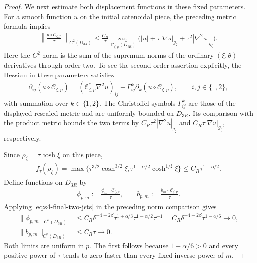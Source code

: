 \documentclass[a4paper,11pt,oneside,reqno]{amsart}
\numberwithin{equation}{section}
\theoremstyle{definition}
\begin{document}
\begin{proof}
    We next estimate both displacement functions in these
    fixed parameters. For a smooth function $u$ on the
    initial catenoidal piece, the preceding metric formula
    implies
    \begin{align*}
        \left\|\frac{u\circ\mathcal C_{\zeta,p}}{\tau}
                \right\|_{C^2(D_{3R})}
        \leq \frac{C_R}{\tau}
        \sup_{\mathcal C_{\zeta,p}(D_{3R})}
        \bigl(|u|+\tau|\nabla u|_{g_\zeta}
                    +\tau^2|\nabla^2u|_{g_\zeta}\bigr).
    \end{align*}
    Here the $C^2$ norm is the sum of the supremum norms of
    the ordinary $(\xi,\theta)$ derivatives through order two.
    To see the second-order assertion explicitly, the Hessian
    in these parameters satisfies
    \begin{align*}
        \partial_{ij}(u\circ\mathcal C_{\zeta,p})
        = (\mathcal C_{\zeta,p}^*\nabla^2u)_{ij}
          +\Gamma^k_{ij}
             \partial_k(u\circ\mathcal C_{\zeta,p}),
        \qquad i,j\in\{1,2\},
    \end{align*}
    with summation over $k\in\{1,2\}$. The Christoffel
    symbols $\Gamma^k_{ij}$ are those of the displayed
    rescaled metric and are uniformly bounded on $D_{3R}$.
    Its comparison with the product metric bounds the two
    terms by $C_R\tau^2|\nabla^2u|_{g_\zeta}$ and
    $C_R\tau|\nabla u|_{g_\zeta}$, respectively.

    Since $\rho_\zeta=\tau\cosh\xi$ on this piece,
    \begin{align*}
        f_\tau(\rho_\zeta)
        =\max\{\tau^{3/2}\cosh^{3/2}\xi,
                 \tau^{1-\alpha/2}\cosh^{1/2}\xi\}
        \leq C_R\tau^{1-\alpha/2}.
    \end{align*}
    Define functions on $D_{3R}$ by
    \begin{align*}
        \overline\phi_{p,m}
        :=\frac{\phi_m\circ\mathcal C_{\zeta,p}}\tau,
        \qquad
        \overline b_{p,m}
        :=\frac{b_m\circ\mathcal C_{\zeta,p}}\tau.
    \end{align*}
    Applying \eqref{eq:s4-final-two-jets} in the preceding
    norm comparison gives
    \begin{align*}
        \|\overline\phi_{p,m}\|_{C^2(D_{3R})}
        &\leq C_R\delta^{-4-2\beta}
            \tau^{1+\alpha/3}\tau^{1-\alpha/2}\tau^{-1}
          =C_R\delta^{-4-2\beta}\tau^{1-\alpha/6}
          \rightarrow0,\\
        \|\overline b_{p,m}\|_{C^2(D_{3R})}
        &\leq C_R\tau\rightarrow0.
    \end{align*}
    Both limits are uniform in $p$. The first follows because
    $1-\alpha/6>0$ and every positive power of $\tau$ tends
    to zero faster than every fixed inverse power of $m$.


\end{proof}
\end{document}
